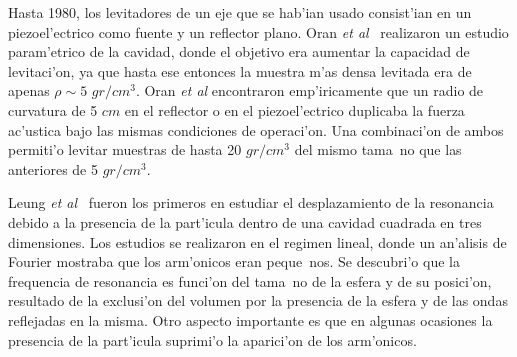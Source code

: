 Hasta 1980, los levitadores de un eje que se hab'ian usado consist'ian en un piezoel'ectrico como fuente y un reflector
plano. Oran {\it et al}~\cite{oran80} realizaron un estudio param'etrico de la cavidad, donde el objetivo
era aumentar la capacidad de levitaci'on, ya que hasta ese entonces la muestra m'as densa levitada era de
apenas $\rho \sim 5$ $gr/cm^3$. Oran {\it et al} encontraron emp'iricamente que un radio de curvatura de 5 $cm$ en el reflector
o en el piezoel'ectrico duplicaba la fuerza ac'ustica bajo las mismas condiciones de operaci'on. Una combinaci'on
de ambos permiti'o levitar muestras de hasta 20 $gr/cm^3$ del mismo tama~no que las anteriores de 5 $gr/cm^3$. 



Leung {\it et al}~\cite{leung82} fueron los primeros en estudiar el
desplazamiento de la resonancia debido a la presencia de la part'icula dentro de una cavidad cuadrada
en tres dimensiones. Los estudios se realizaron en el regimen lineal, donde un an'alisis de Fourier
mostraba que los arm'onicos eran peque~nos. Se descubri'o que la frequencia de resonancia es funci'on del 
tama~no de la esfera y de su posici'on, resultado de la exclusi'on del volumen por la presencia de 
la esfera y de las ondas reflejadas en la misma.  Otro aspecto importante es que en algunas ocasiones
la presencia de la part'icula suprimi'o la aparici'on de los arm'onicos.

